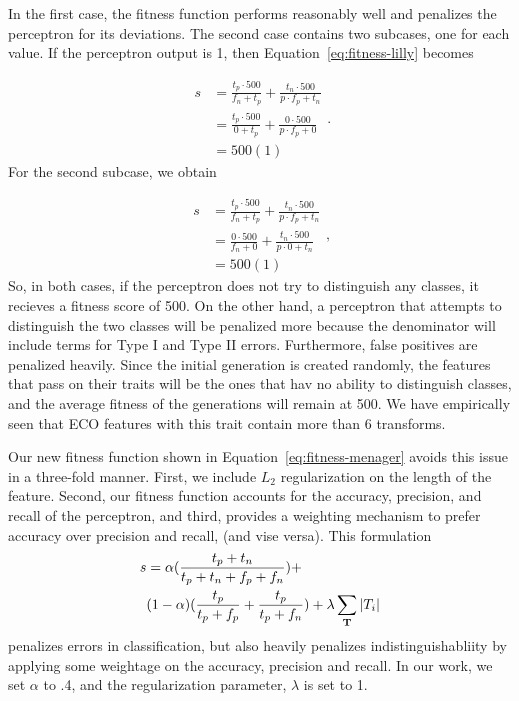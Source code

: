 \documentclass[conference]{IEEEtran}
\begin{document}
In the first case, the fitness function performs reasonably well and penalizes the perceptron for its deviations. The second case contains two subcases, one for each value. If the perceptron output is 1, then Equation~\ref{eq:fitness-lilly} becomes

\begin{equation}
  \begin{split}
    s & = \frac{t_p \cdot 500}{f_n + t_p} + \frac{t_n \cdot 500}{p \cdot f_p+ t_n}\\
    & = \frac{t_p \cdot 500}{0 + t_p} + \frac{0 \cdot 500}{p \cdot f_p + 0}\\
    & = 500(1)
  \end{split}.
  \label{eq:fitness-lilly-decompose}
\end{equation}
For the second subcase, we obtain

\begin{equation}
  \begin{split}
    s & = \frac{t_p \cdot 500}{f_n + t_p} + \frac{t_n \cdot 500}{p \cdot f_p+ t_n}\\
    & = \frac{0 \cdot 500}{f_n + 0} + \frac{t_n \cdot 500}{p \cdot 0 + t_n}\\
    & = 500(1)
  \end{split},
  \label{eq:fitness-lilly-decompose2}
\end{equation}
So, in both cases, if the perceptron does not try to distinguish any classes, it recieves a fitness score of 500. On the other hand, a perceptron that attempts to distinguish the two classes will be penalized more because the denominator will include terms for Type I and Type II errors. Furthermore, false positives are penalized heavily. Since the initial generation is created randomly, the features that pass on their traits will be the ones that hav no ability to distinguish classes, and the average fitness of the generations will remain at 500. We have empirically seen that ECO features with this trait contain more than 6 transforms.

Our new fitness function shown in Equation~\ref{eq:fitness-menager} avoids this issue in a three-fold manner. First, we include $L_2$ regularization on the length of the feature. Second, our fitness function accounts for the accuracy, precision, and recall of the perceptron, and third, provides a weighting mechanism to prefer accuracy over precision and recall, (and vise versa). This formulation
\begin{equation}
  \begin{split}
    s & = \alpha(\frac{t_p + t_n}{t_p + t_n + f_p + f_n}) +\\
    &(1 - \alpha)(\frac{t_p}{t_p + f_p} + \frac{t_p}{t_p + f_n}) + \lambda \sum_{\bf T} |T_i|
    \end{split}
  \label{eq:fitness-menager}
\end{equation}
penalizes errors in classification, but also heavily penalizes indistinguishabliity by applying some weightage on the accuracy, precision and recall. In our work, we set $\alpha$ to .4, and the regularization parameter, $\lambda$ is set to 1.
\end{document}
